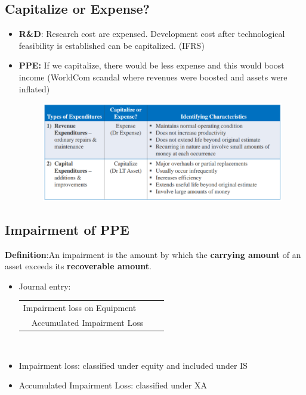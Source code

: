 \documentclass{article}
\begin{document}
\begin{multicols}{2}
\subsection{Capitalize or Expense?}
\begin{itemize}
	\item \textbf{R\&D}: Research cost are expensed. Development cost after technological feasibility is established can be capitalized. (IFRS)
	\item \textbf{PPE:} If we capitalize, there would be less expense and this would boost income (WorldCom scandal where revenues were boosted and assets were inflated)
	\begin{figure}[H]
		\centering
		\includegraphics[width=\columnwidth]{image/cap_exp.png}
	\end{figure}
\end{itemize}
\subsection{Impairment of PPE}
\textbf{Definition}:An impairment is the amount by which the \textbf{carrying amount} of an asset exceeds its \textbf{recoverable amount}.
\begin{itemize}
	\item Journal entry:\vspace{0.5em}\\
	\begin{tabular}{llll}
		\multicolumn{4}{l}{Impairment loss on Equipment}\\
		& Accumulated Impairment Loss& &
	\end{tabular}\vspace{0.5em}\\
    \item Impairment loss: classified under equity and included under IS
    \item Accumulated Impairment Loss: classified under XA
\end{itemize}

\end{multicols}
\end{document}
